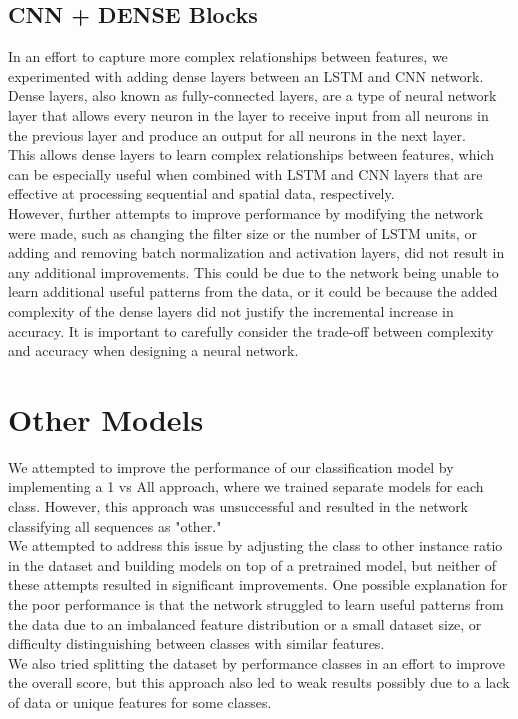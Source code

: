 \documentclass[11pt]{article}
\begin{document}
\subsection{CNN + DENSE Blocks}
In an effort to capture more complex relationships between features, we experimented with adding dense layers between an LSTM and CNN network.
Dense layers, also known as fully-connected layers, are a type of neural network layer that allows every neuron in the layer to receive input from all neurons in the previous layer and produce an output for all neurons in the next layer.\\
This allows dense layers to learn complex relationships between features, which can be especially useful when combined with LSTM and CNN layers that are effective at processing sequential and spatial data, respectively.\\
However, further attempts to improve performance by modifying the network were made, such as changing the filter size or the number of LSTM units, or adding and removing batch normalization and activation layers, did not result in any additional improvements.
This could be due to the network being unable to learn additional useful patterns from the data, or it could be because the added complexity of the dense layers did not justify the incremental increase in accuracy.
It is important to carefully consider the trade-off between complexity and accuracy when designing a neural network.


\section{Other Models}
We attempted to improve the performance of our classification model by implementing a 1 vs All approach, where we trained separate models for each class.
However, this approach was unsuccessful and resulted in the network classifying all sequences as "other."\\
We attempted to address this issue by adjusting the class to other instance ratio in the dataset and building models on top of a pretrained model, but neither of these attempts resulted in significant improvements.
One possible explanation for the poor performance is that the network struggled to learn useful patterns from the data due to an imbalanced feature distribution or a small dataset size, or difficulty distinguishing between classes with similar features.\\
We also tried splitting the dataset by performance classes in an effort to improve the overall score, but this approach also led to weak results possibly due to a lack of data or unique features for some classes.
\end{document}
